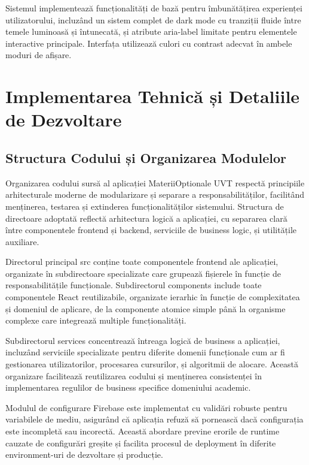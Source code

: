 \documentclass[12pt,a4paper]{report}
\begin{document}
Sistemul implementează funcționalități de bază pentru îmbunătățirea experienței utilizatorului, incluzând un sistem complet de dark mode cu tranziții fluide între temele luminoasă și întunecată, și atribute aria-label limitate pentru elementele interactive principale. Interfața utilizează culori cu contrast adecvat în ambele moduri de afișare.

\chapter{Implementarea Tehnică și Detaliile de Dezvoltare}

\section{Structura Codului și Organizarea Modulelor}

Organizarea codului sursă al aplicației MateriiOptionale UVT respectă principiile arhitecturale moderne de modularizare și separare a responsabilităților, facilitând menținerea, testarea și extinderea funcționalităților sistemului. Structura de directoare adoptată reflectă arhitectura logică a aplicației, cu separarea clară între componentele frontend și backend, serviciile de business logic, și utilitățile auxiliare.

Directorul principal src conține toate componentele frontend ale aplicației, organizate în subdirectoare specializate care grupează fișierele în funcție de responsabilitățile funcționale. Subdirectorul components include toate componentele React reutilizabile, organizate ierarhic în funcție de complexitatea și domeniul de aplicare, de la componente atomice simple până la organisme complexe care integrează multiple funcționalități.

Subdirectorul services concentrează întreaga logică de business a aplicației, incluzând serviciile specializate pentru diferite domenii funcționale cum ar fi gestionarea utilizatorilor, procesarea cursurilor, și algoritmii de alocare. Această organizare facilitează reutilizarea codului și menținerea consistenței în implementarea regulilor de business specifice domeniului academic.

Modulul de configurare Firebase este implementat cu validări robuste pentru variabilele de mediu, asigurând că aplicația refuză să pornească dacă configurația este incompletă sau incorectă. Această abordare previne erorile de runtime cauzate de configurări greșite și facilita procesul de deployment în diferite environment-uri de dezvoltare și producție.
\end{document}
